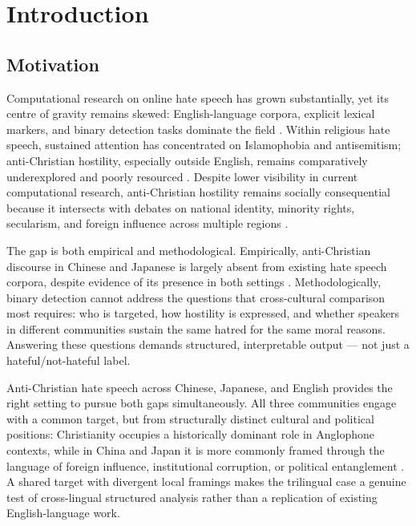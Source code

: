 \documentclass[../CLthesis.tex]{subfiles}
\begin{document}
\chapter{Introduction}%
\label{chap:intro}

\section{Motivation}

Computational research on online hate speech has grown substantially, yet its centre of gravity remains skewed: English-language corpora, explicit lexical markers, and binary detection tasks dominate the field \citep{jahan_systematic_2023, ramos_comprehensive_2024}. Within religious hate speech, sustained attention has concentrated on Islamophobia and antisemitism; anti-Christian hostility, especially outside English, remains comparatively underexplored and poorly resourced \citep{albadi_are_2018, vidgen_detecting_2020, Evolvi2018, mathew_hatexplain_2021, mollas_ethos_2022}. Despite lower visibility in current computational research, anti-Christian hostility remains socially consequential because it intersects with debates on national identity, minority rights, secularism, and foreign influence across multiple regions \citep{casanova1994public, casanova2007rethinking}.


The gap is both empirical and methodological. Empirically, anti-Christian discourse in Chinese and Japanese is largely absent from existing hate speech corpora, despite evidence of its presence in both settings \citep{yang2011religion, mullins2021religion}. Methodologically, binary detection cannot address the questions that cross-cultural comparison most requires: who is targeted, how hostility is expressed, and whether speakers in different communities sustain the same hatred for the same moral reasons. Answering these questions demands structured, interpretable output --- not just a hateful/not-hateful label.

Anti-Christian hate speech across Chinese, Japanese, and English provides the right setting to pursue both gaps simultaneously. All three communities engage with a common target, but from structurally distinct cultural and political positions: Christianity occupies a historically dominant role in Anglophone contexts, while in China and Japan it is more commonly framed through the language of foreign influence, institutional corruption, or political entanglement \citep{yang2011religion, dunch_beyond_2002, mullins1998christianity, mullins2021religion}. A shared target with divergent local framings makes the trilingual case a genuine test of cross-lingual structured analysis rather than a replication of existing English-language work.
\end{document}
